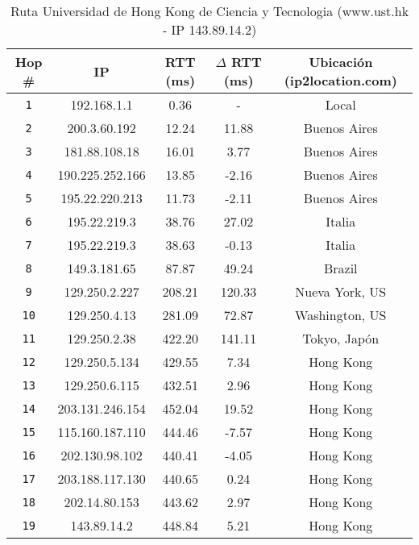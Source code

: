 \begin{table}[H]\begin{center}
    \begin{tabular}{|c|c|c|c|c|}
    \hline
    \textbf{Hop \#} & \textbf{IP} & \textbf{RTT (ms)} & \textbf{$\Delta$ RTT (ms)} & \textbf{Ubicación (ip2location.com)} \\ \hline
    \texttt{1} &  192.168.1.1 & 0.36        &  -        & Local \\ \hline
    \texttt{2} &  200.3.60.192 & 12.24      & 11.88     & Buenos Aires \\ \hline
    \texttt{3} &  181.88.108.18 & 16.01     & 3.77      & Buenos Aires \\ \hline
    \texttt{4} &  190.225.252.166 & 13.85   & -2.16     & Buenos Aires \\ \hline
    \texttt{5} &  195.22.220.213 & 11.73    & -2.11     & Buenos Aires \\ \hline
    \texttt{6} &  195.22.219.3 & 38.76      & 27.02     & Italia \\ \hline
    \texttt{7} &  195.22.219.3 & 38.63      & -0.13     & Italia \\ \hline
    \texttt{8} &  149.3.181.65 & 87.87      & 49.24     & Brazil \\ \hline
    \texttt{9} &  129.250.2.227 & 208.21    & 120.33    & Nueva York, US \\ \hline
    \texttt{10} & 129.250.4.13 & 281.09     & 72.87     & Washington, US \\ \hline
    \texttt{11} & 129.250.2.38 & 422.20     & 141.11    & Tokyo, Japón \\ \hline
    \texttt{12} & 129.250.5.134 & 429.55    & 7.34      & Hong Kong \\ \hline
    \texttt{13} & 129.250.6.115 & 432.51    & 2.96      & Hong Kong \\ \hline
    \texttt{14} & 203.131.246.154 & 452.04  & 19.52     & Hong Kong \\ \hline
    \texttt{15} & 115.160.187.110 & 444.46  & -7.57     & Hong Kong \\ \hline
    \texttt{16} & 202.130.98.102 & 440.41   & -4.05     & Hong Kong \\ \hline
    \texttt{17} & 203.188.117.130 & 440.65  & 0.24      & Hong Kong \\ \hline
    \texttt{18} & 202.14.80.153 & 443.62    & 2.97      & Hong Kong \\ \hline
    \texttt{19} & 143.89.14.2 & 448.84      & 5.21      & Hong Kong \\ \hline
    \end{tabular}
    \caption{Ruta Universidad de Hong Kong de Ciencia y Tecnologia (www.ust.hk  - IP 143.89.14.2)}
\end{center}
\end{table}

